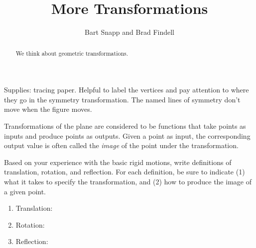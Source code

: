 \documentclass[nooutcomes]{ximera}
\title{More Transformations}
\author{Bart Snapp and Brad Findell}
\begin{document}
\begin{abstract}
  We think about geometric transformations.
\end{abstract}
\maketitle

\begin{teachingnote}
Supplies:  tracing paper.  Helpful to label the vertices and pay attention to where they go in the symmetry transformation.  The named lines of symmetry don't move when the figure moves.
\end{teachingnote}

Transformations of the plane are considered to be functions that take points as inputs and produce 
points as outputs.  Given a point as input, the corresponding output value is often called 
the \emph{image} of the point under the transformation.%
\begin{problem}
Based on your experience with the basic rigid motions, write definitions of translation, rotation, and reflection.%
For each definition, be sure to indicate (1) what it takes to specify the transformation, and (2) how to produce the image of a given point.  
\begin{enumerate}
\item Translation: 
\vspace{0.3in}
\item Rotation: 
\vspace{0.3in}
\item Reflection: 
\vspace{0.3in}
\end{enumerate}
\end{problem}
\end{document}
